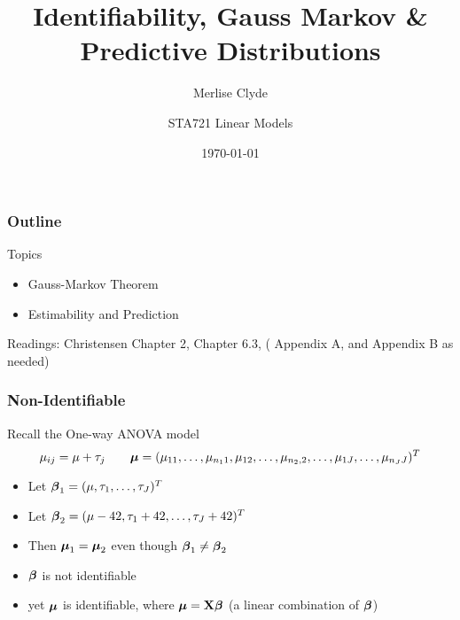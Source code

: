\documentclass[handout]{beamer}\usepackage[]{graphicx}\usepackage[]{color}
\title{Identifiability, Gauss Markov \& Predictive Distributions}
\subtitle{Merlise Clyde}
\author{STA721 Linear Models}
\institute{Duke University}
\date{\today}
\begin{document}
\maketitle

\begin{frame}\frametitle{Outline}
Topics
  \begin{itemize}
  \item Gauss-Markov Theorem
  \item Estimability and Prediction
  \end{itemize}


Readings: Christensen Chapter 2,  Chapter 6.3, ( Appendix A, and
Appendix B as needed)
\end{frame}

\begin{frame}
\frametitle{Non-Identifiable }
  Recall the One-way ANOVA model
$$\mu_{ij} = \mu + \tau_j \qquad \boldsymbol{\mu} = (
    \mu_{11}, \ldots,\mu_{n_1 1},\mu_{12},\ldots, \mu_{n_2,2},\ldots, \mu_{1J},
\ldots,
\mu_{n_J J})^T $$
\begin{itemize}
\item Let $\boldsymbol{\beta}_{1} = (\mu, \tau_1, \ldots, \tau_J)^T$
\item Let $\boldsymbol{\beta}_{2} = (\mu - 42, \tau_1 + 42, \ldots, \tau_J + 42)^T$
\item Then $\boldsymbol{\mu}_{1} = \boldsymbol{\mu}_{2}$ even though  $\boldsymbol{\beta}_1 \neq \boldsymbol{\beta}_2$
\item $\boldsymbol{\beta}$ is not identifiable
\item yet  $\boldsymbol{\mu}$ is identifiable, where $\boldsymbol{\mu} = \mathbf{X} \boldsymbol{\beta}$  (a linear
  combination of $\boldsymbol{\beta}$)
\end{itemize}
\end{frame}
\end{document}

